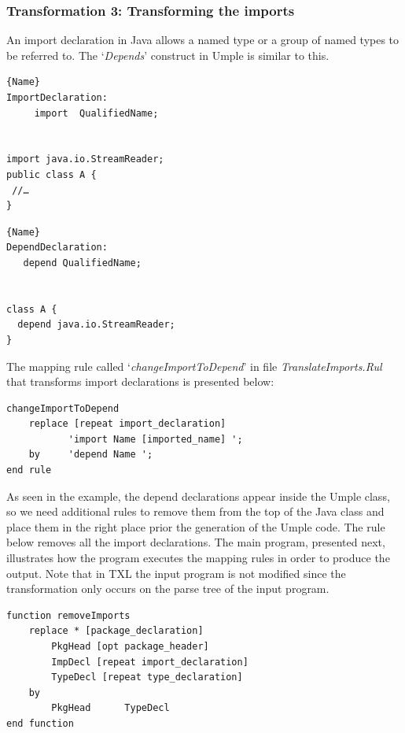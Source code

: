 \subsubsection{Transformation 3: Transforming the imports} 

An import declaration in Java allows a named type or a group of named types to be referred to. The `\textit{Depends}' construct in Umple is similar to this. 

\noindent\begin{minipage}{.45\textwidth}
\begin{lstlisting}[style=umplePlain,caption=Java Import]{Name}
ImportDeclaration:
     import  QualifiedName; 


import java.io.StreamReader;
public class A {
 //…
}
\end{lstlisting}
\end{minipage}\hfill
\begin{minipage}{.45\textwidth}
\begin{lstlisting}[style=umplePlain,caption=Umple Depend]{Name}
DependDeclaration:
   depend QualifiedName;


class A {
  depend java.io.StreamReader;
}
\end{lstlisting}
\end{minipage}

The mapping rule called `\textit{changeImportToDepend}' in file \textit{TranslateImports.Rul} that transforms import declarations is presented below: 

\begin{lstlisting}[style=umplePlain, label=lst:packageDeclRule, caption=TXL mapping rule for the transformation of the import declaration] 
changeImportToDepend  	
    replace [repeat import_declaration]      
           'import Name [imported_name] '; 
    by 	   'depend Name '; 
end rule
\end{lstlisting}

As seen in the example, the depend declarations appear inside the Umple class, so we need additional rules to remove them from the top of the Java class and place them in the right place prior the generation of the Umple code. The rule below removes all the import declarations. The main program, presented next, illustrates how the program executes the mapping rules in order to produce the output. Note that in TXL the input program is not modified since the transformation only occurs on the parse tree of the input program.

\begin{lstlisting}[style=umplePlain, label=lst:packageDeclRule2, caption=Helper Function used to remove the imports declarations] 
function removeImports  
    replace * [package_declaration]
        PkgHead [opt package_header]   
        ImpDecl [repeat import_declaration]  
        TypeDecl [repeat type_declaration] 
    by   
        PkgHead      TypeDecl
end function
\end{lstlisting}


